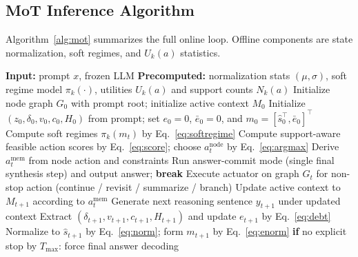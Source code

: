 \documentclass{article}
\begin{document}
\subsection{MoT Inference Algorithm}
\label{sec:algo}

Algorithm~\ref{alg:mot} summarizes the full online loop. Offline components are state normalization, soft regimes, and $U_k(a)$ statistics.

\begin{algorithm}[t]
\caption{MoT Inference (State-Driven Node/Memory Control)}
\label{alg:mot}
\begin{algorithmic}[1]
\STATE \textbf{Input:} prompt $x$, frozen LLM
\STATE \textbf{Precomputed:} normalization stats $(\mu,\sigma)$, soft regime model $\pi_k(\cdot)$, utilities $U_k(a)$ and support counts $N_k(a)$
\STATE Initialize node graph $G_0$ with prompt root; initialize active context $M_0$
\STATE Initialize $(z_0,\delta_0,v_0,c_0,H_0)$ from prompt; set $e_0=0$, $\bar e_0=0$, and $m_0=[\hat s_0^\top,\bar e_0]^\top$
    \STATE Compute soft regimes $\pi_k(m_t)$ by Eq.~\eqref{eq:softregime}
    \STATE Compute support-aware feasible action scores by Eq.~\eqref{eq:score}; choose $a_t^{\text{node}}$ by Eq.~\eqref{eq:argmax}
    \STATE Derive $a_t^{\text{mem}}$ from node action and constraints
        \STATE Run answer-commit mode (single final synthesis step) and output answer; \textbf{break}
    \ENDIF
    \STATE Execute actuator on graph $G_t$ for non-stop action (continue / revisit / summarize / branch)
    \STATE Update active context to $M_{t+1}$ according to $a_t^{\text{mem}}$
    \STATE Generate next reasoning sentence $y_{t+1}$ under updated context
    \STATE Extract $(\delta_{t+1},v_{t+1},c_{t+1},H_{t+1})$ and update $e_{t+1}$ by Eq.~\eqref{eq:debt}
    \STATE Normalize to $\hat s_{t+1}$ by Eq.~\eqref{eq:norm}; form $m_{t+1}$ by Eq.~\eqref{eq:enorm}
\ENDFOR
\STATE \textbf{if} no explicit stop by $T_{\max}$: force final answer decoding
\end{algorithmic}
\end{algorithm}
\end{document}
